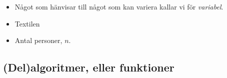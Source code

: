\begin{frame}[fragile]
  \begin{definition}[Variabel]
    \begin{itemize}
      \item Något som hänvisar till något som kan variera kallar vi för 
        \emph{variabel}.
    \end{itemize}
  \end{definition}

  \pause

  \begin{example}[Variabler]
    \begin{itemize}
      \item Textilen
      \item Antal personer, \(n\).
    \end{itemize}
  \end{example}
\end{frame}

\subsection{(Del)algoritmer, eller funktioner}


